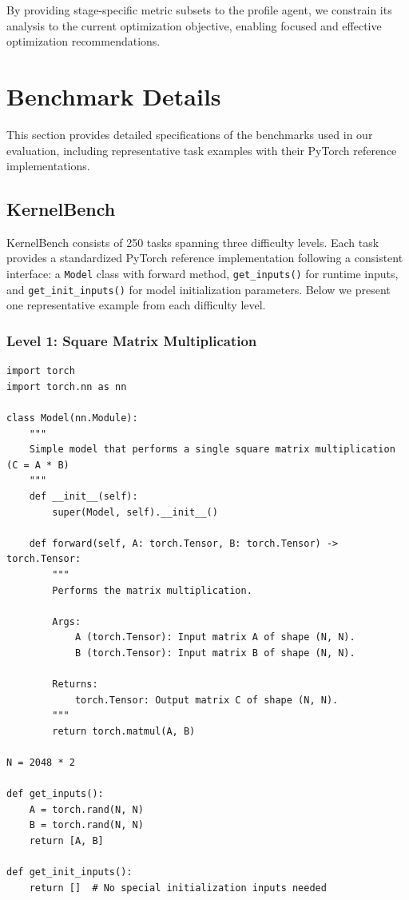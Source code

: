 By providing stage-specific metric subsets to the profile agent, we constrain its analysis to the current optimization objective, enabling focused and effective optimization recommendations.

\section{Benchmark Details}

This section provides detailed specifications of the benchmarks used in our evaluation, including representative task examples with their PyTorch reference implementations.

\subsection{KernelBench}

KernelBench consists of 250 tasks spanning three difficulty levels. Each task provides a standardized PyTorch reference implementation following a consistent interface: a \texttt{Model} class with forward method, \texttt{get\_inputs()} for runtime inputs, and \texttt{get\_init\_inputs()} for model initialization parameters. Below we present one representative example from each difficulty level.

\subsubsection{Level 1: Square Matrix Multiplication}
\begin{mdframed}[linewidth=1pt, linecolor=black, backgroundcolor=gray!5]
\begin{lstlisting}
import torch
import torch.nn as nn

class Model(nn.Module):
    """
    Simple model that performs a single square matrix multiplication (C = A * B)
    """
    def __init__(self):
        super(Model, self).__init__()
    
    def forward(self, A: torch.Tensor, B: torch.Tensor) -> torch.Tensor:
        """
        Performs the matrix multiplication.

        Args:
            A (torch.Tensor): Input matrix A of shape (N, N).
            B (torch.Tensor): Input matrix B of shape (N, N).

        Returns:
            torch.Tensor: Output matrix C of shape (N, N).
        """
        return torch.matmul(A, B)

N = 2048 * 2

def get_inputs():
    A = torch.rand(N, N)
    B = torch.rand(N, N)
    return [A, B]

def get_init_inputs():
    return []  # No special initialization inputs needed
\end{lstlisting}
\end{mdframed}

